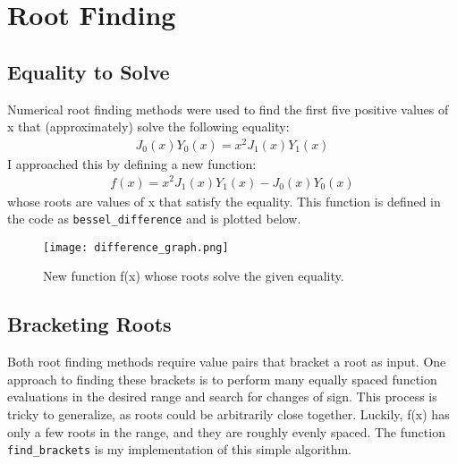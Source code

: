 \documentclass[12pt]{article}
\begin{document}
\section{Root Finding}
\subsection{Equality to Solve}
Numerical root finding methods were used to find the first five positive values of x that (approximately) solve the following equality:
\begin{align*}
J_0(x)Y_0(x) = x^2J_1(x)Y_1(x)
\end{align*}
I approached this by defining a new function:
\begin{align*}
f(x) = x^2J_1(x)Y_1(x) - J_0(x)Y_0(x)
\end{align*}
whose roots are values of x that satisfy the equality. This function is defined in the code as \texttt{bessel\_difference} and is plotted below.
\begin{figure}[H]
  \centering
  \texttt{[image: difference\_graph.png]}
  \caption{New function f(x) whose roots solve the given equality.}
\end{figure}
\subsection{Bracketing Roots}
Both root finding methods require value pairs that bracket a root as input. One approach to finding these brackets is to perform many equally spaced function evaluations in the desired range and search for changes of sign. This process is tricky to generalize, as roots could be arbitrarily close together. Luckily, f(x) has only a few roots in the range, and they are roughly evenly spaced. The function \texttt{find\_brackets} is my implementation of this simple algorithm.
\end{document}
